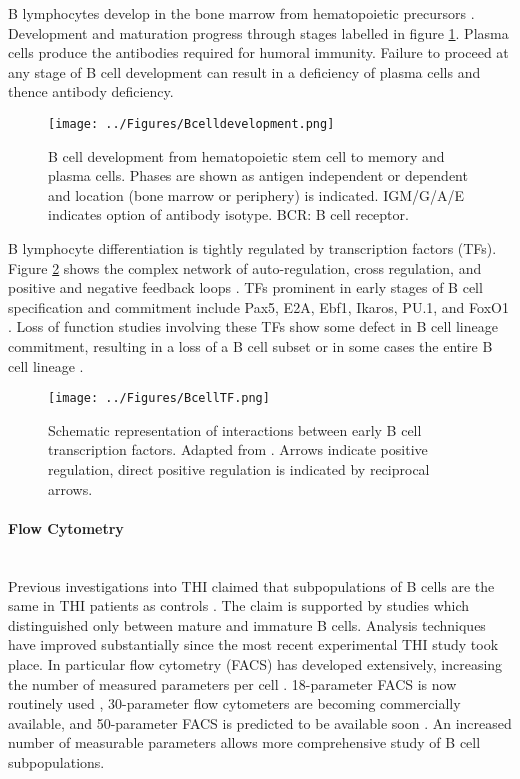 \documentclass[12pt]{article}
\begin{document}
			B lymphocytes develop in the bone marrow from hematopoietic precursors \citep{Cooper15}.
			Development and maturation progress through stages labelled in figure \ref{fig:BCellDevelopment}. 
			Plasma cells produce the antibodies required for humoral immunity.
			Failure to proceed at any stage of B cell development can result in a deficiency of plasma cells and thence antibody deficiency.
			
			
			\begin{figure}[tb]
				\centering
				\texttt{[image: ../Figures/Bcelldevelopment.png]}
				\caption{B cell development from hematopoietic stem cell to memory and plasma cells. Phases are shown as antigen independent or dependent and location (bone marrow or periphery) is indicated. IGM/G/A/E indicates option of antibody isotype. BCR: B cell receptor.}
				\label{fig:BCellDevelopment}
			\end{figure}
			
			B lymphocyte differentiation is tightly regulated by transcription factors (TFs).
			Figure \ref{fig:TFBcell} shows the complex network of auto-regulation, cross regulation, and positive and negative feedback loops \citep{Choukrallah14,Polansky08,Oakes16,Zan15,Li13,Mercer11,Kulis15,McManus11}.
			TFs prominent in early stages of B cell specification and commitment include Pax5, E2A, Ebf1, Ikaros, PU.1, and FoxO1 \citep{Gao09,Maier04,Walter08,Decker09,Lin10,McManus11,Treiber10,Zandi00}. 
			Loss of function studies involving these TFs show some defect in B cell lineage commitment, resulting in a loss of a B cell subset or in some cases the entire B cell lineage \citep{Choukrallah14}.

			
			\begin{figure}
				\centering
				\texttt{[image: ../Figures/BcellTF.png]}
				\caption{Schematic representation of interactions between early B cell transcription factors. Adapted from \citet{Choukrallah14}. Arrows indicate positive regulation, direct positive regulation is indicated by reciprocal arrows.}
				\label{fig:TFBcell}
			\end{figure}
		
		
			\paragraph{Flow Cytometry}
			~\\
			Previous investigations into THI claimed that subpopulations of B cells are the same in THI patients as controls \citep{Tiller78,Stiemh80,Siegel81,Buckley83,Fiorilli86,Dressler89}. 
			The claim is supported by studies which distinguished only between mature and immature B cells. 
			Analysis techniques have improved substantially since the most recent experimental THI study took place.
			In particular flow cytometry (FACS) has developed extensively, increasing the number of measured parameters per cell \citep{Saeys16}.
			18-parameter FACS is now routinely used \citep{Perfetto04}, 30-parameter flow cytometers are becoming commercially available, and 50-parameter FACS is predicted to be available soon \citep{Saeys16}.
			An increased number of measurable parameters allows more comprehensive study of B cell subpopulations.
			
\end{document}
